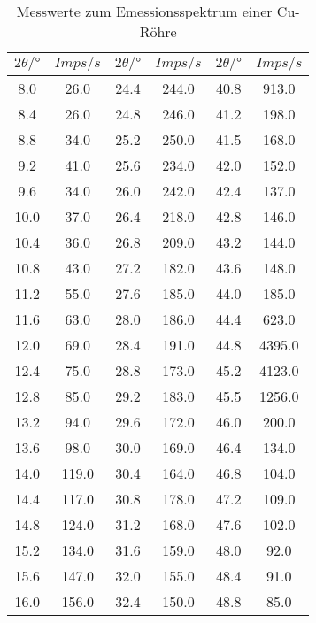 \begin{table}[H]
    \centering
    \caption{Messwerte zum Emessionsspektrum einer Cu-Röhre}
    \label{tab:2}
    \begin{tabular}{c c c c c c}
        \toprule
        $2 \theta /° $ & $Imps/s$ & $2 \theta /° $ & $Imps/s$ & $2 \theta /°$ & $Imps/s$  \\
        \midrule
        8.0	  &   26.0    &  24.4	&  244.0  & 40.8  &  913.0   \\                    
        8.4	  &   26.0    &  24.8	&  246.0  & 41.2  &  198.0   \\                   
        8.8	  &   34.0    &  25.2	&  250.0  & 41.5  &  168.0  \\
        9.2	  &   41.0    &  25.6	&  234.0  & 42.0  &  152.0  \\
        9.6	  &   34.0    &  26.0	&  242.0  & 42.4  &  137.0  \\
        10.0  &	  37.0    &  26.4	&  218.0  & 42.8  &  146.0  \\
        10.4  &	  36.0    &  26.8	&  209.0  & 43.2  &  144.0  \\
        10.8  &	  43.0    &  27.2	&  182.0  & 43.6  &  148.0  \\
        11.2  &	  55.0    &  27.6	&  185.0  & 44.0  &  185.0  \\
        11.6  &	  63.0    &  28.0	&  186.0  & 44.4  &  623.0  \\
        12.0  &	  69.0    &  28.4	&  191.0  & 44.8  &  4395.0  \\
        12.4  &	  75.0    &  28.8	&  173.0  & 45.2  &  4123.0  \\
        12.8  &	  85.0    &  29.2	&  183.0  & 45.5  &  1256.0  \\
        13.2  &	  94.0    &  29.6	&  172.0  & 46.0  &  200.0  \\
        13.6  &	  98.0    &  30.0	&  169.0  & 46.4  &  134.0  \\
        14.0  &	  119.0   &  30.4	&  164.0  & 46.8  &  104.0  \\
        14.4  &	  117.0   &  30.8	&  178.0  & 47.2  &  109.0  \\
        14.8  &	  124.0   &  31.2	&  168.0  & 47.6  &  102.0  \\
        15.2  &	  134.0   &  31.6	&  159.0  & 48.0  &  92.0  \\
        15.6  &	  147.0   &  32.0	&  155.0  & 48.4  &  91.0  \\
        16.0  &	  156.0   &  32.4	&  150.0  & 48.8  &  85.0  \\

\end{tabular}
\end{table}
